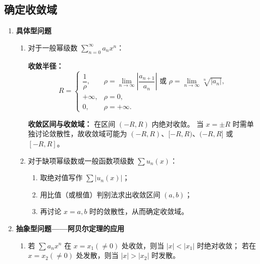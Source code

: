 \subsection{确定收敛域}

\begin{enumerate}
    \item \textbf{具体型问题}
          \begin{enumerate}
              \item 对于一般幂级数 $\displaystyle \sum_{n=0}^{\infty} a_n x^n$：

                    \textbf{收敛半径：}
                    \[
                        R =
                        \begin{cases}
                            \dfrac{1}{\rho}, & \rho = \lim\limits_{n\to\infty}\left|\dfrac{a_{n+1}}{a_n}\right|
                            \text{ 或 } \rho = \lim\limits_{n\to\infty}\sqrt[n]{|a_n|},                          \\[0.8em]
                            +\infty,         & \rho = 0,                                                        \\[0.3em]
                            0,               & \rho = +\infty.
                        \end{cases}
                    \]

                    \textbf{收敛区间与收敛域：}
                    在区间 $(-R, R)$ 内绝对收敛。
                    当 $x = \pm R$ 时需单独讨论敛散性，故收敛域可能为
                    $(-R, R)$、$[-R, R)$、$(-R, R]$ 或 $[-R, R]$。

              \item 对于缺项幂级数或一般函数项级数 $\sum u_n(x)$：

                    \begin{enumerate}
                        \item 取绝对值写作 $\sum |u_n(x)|$；
                        \item 用比值（或根值）判别法求出收敛区间 $(a,b)$；
                        \item 再讨论 $x=a,b$ 时的敛散性，从而确定收敛域。
                    \end{enumerate}
          \end{enumerate}

    \item \textbf{抽象型问题——阿贝尔定理的应用}
          \begin{enumerate}
              \item 若 $\sum a_n x^n$ 在 $x=x_1(\ne 0)$ 处收敛，则当 $|x|<|x_1|$ 时绝对收敛；
                    若在 $x=x_2(\ne 0)$ 处发散，则当 $|x|>|x_2|$ 时发散。


\end{enumerate}
\end{enumerate}
